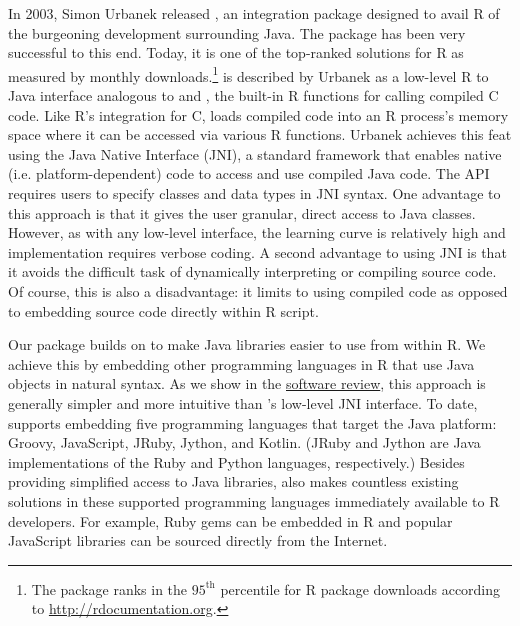 In 2003, Simon Urbanek released  \citep{rjava}, an integration package designed to avail R of the burgeoning development surrounding Java. The package has been very successful to this end. Today, it is one of the top-ranked solutions for R as measured by monthly downloads.\footnote{The  package ranks in the $95^{\text{th}}$ percentile for R package downloads according to \url{http://rdocumentation.org}.}  is described by Urbanek as a low-level R to Java interface analogous to  and , the built-in R functions for calling compiled C code. Like R's integration for C,  loads compiled code into an R process's memory space where it can be accessed via various R functions. Urbanek achieves this feat using the Java Native Interface (JNI), a standard framework that enables native (i.e. platform-dependent) code to access and use compiled Java code. The  API requires users to specify classes and data types in JNI syntax. One advantage to this approach is that it gives the user granular, direct access to Java classes. However, as with any low-level interface, the learning curve is relatively high and implementation requires verbose coding. A second advantage to using JNI is that it avoids the difficult task of dynamically interpreting or compiling source code. Of course, this is also a disadvantage: it limits  to using compiled code as opposed to embedding source code directly within R script.

Our  package \citep{jsr223} builds on  to make Java libraries easier to use from within R. We achieve this by embedding other programming languages in R that use Java objects in natural syntax. As we show in the \hyperlink{rjava-software-review}{ software review}, this approach is generally simpler and more intuitive than 's low-level JNI interface. To date,  supports embedding five programming languages that target the Java platform: Groovy, JavaScript, JRuby, Jython, and Kotlin. (JRuby and Jython are Java implementations of the Ruby and Python languages, respectively.) Besides providing simplified access to Java libraries,  also makes countless existing solutions in these supported programming languages immediately available to R developers. For example, Ruby gems can be embedded in R and popular JavaScript libraries can be sourced directly from the Internet.

